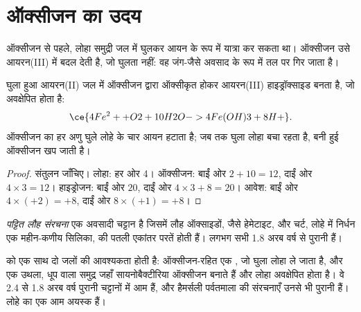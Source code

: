 \section{ऑक्सीजन का उदय}

ऑक्सीजन से पहले, लोहा समुद्री जल में घुलकर आयन
 के रूप में यात्रा कर सकता था। ऑक्सीजन उसे आयरन(III) में बदल देती है, जो घुलता नहीं: वह
जंग-जैसे अवसाद के रूप में तल पर गिर जाता है।

\begin{proposition}\label{prop:g12:early-earth:iron}
घुला हुआ आयरन(II) जल में ऑक्सीजन द्वारा ऑक्सीकृत होकर आयरन(III) हाइड्रॉक्साइड बनता है,
जो अवक्षेपित होता है:
\[
  \ce{4Fe^2+ + O2 + 10H2O -> 4Fe(OH)3 + 8H+} .
\]
ऑक्सीजन का हर अणु घुले लोहे के चार आयन हटाता है; जब तक
घुला लोहा बचा रहता है, बनी हुई ऑक्सीजन खप जाती है।
\end{proposition}

\begin{proof}
संतुलन जाँचिए। लोहा: हर ओर 4। ऑक्सीजन: बाईं ओर $2 + 10 = 12$,
दाईं ओर $4 \times 3 = 12$। हाइड्रोजन: बाईं ओर $20$, दाईं ओर $4 \times 3 + 8 =
20$। आवेश: बाईं ओर $4 \times (+2) = +8$, दाईं ओर $8 \times (+1) =
+8$।
\end{proof}

\begin{definition}[पट्टित लौह संरचना]\label{def:g12:early-earth:bif}
\emph{पट्टित लौह संरचना} एक
अवसादी चट्टान है जिसमें लौह ऑक्साइडों, जैसे
हेमेटाइट, और चर्ट, लोहे में निर्धन एक महीन-कणीय सिलिका, की पतली एकांतर परतें होती हैं। लगभग सभी
1.8 अरब वर्ष से पुरानी हैं।
\end{definition}

 को एक साथ दो जलों की आवश्यकता होती है: ऑक्सीजन-रहित एक ,
जो घुला लोहा ले जाता है, और एक उथला, धूप वाला समुद्र जहाँ सायनोबैक्टीरिया
ऑक्सीजन बनाते हैं और लोहा अवक्षेपित होता है। वे 2.4 से
1.8 अरब वर्ष पुरानी चट्टानों में आम हैं, और हैमर्सली पर्वतमाला की संरचनाएँ उनसे भी पुरानी हैं।
 लोहे का एक आम अयस्क हैं।

